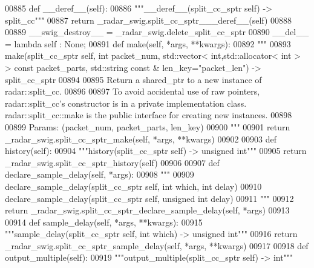 \begin{DoxyCode}
{{{{{00885     \textcolor{keyword}{def }__deref__(self):
00886         \textcolor{stringliteral}{"""\_\_deref\_\_(split\_cc\_sptr self) -> split\_cc"""}
00887         \textcolor{keywordflow}{return} \_radar\_swig.split\_cc\_sptr\_\_\_deref\_\_(self)
00888 
00889     \_\_swig\_destroy\_\_ = \_radar\_swig.delete\_split\_cc\_sptr
00890     \_\_del\_\_ = \textcolor{keyword}{lambda} self : \textcolor{keywordtype}{None};
00891     \textcolor{keyword}{def }make(self, *args, **kwargs):
00892         \textcolor{stringliteral}{"""}
00893 \textcolor{stringliteral}{        make(split\_cc\_sptr self, int packet\_num, std::vector< int,std::allocator< int > > const
       packet\_parts, std::string const & len\_key="packet\_len") -> split\_cc\_sptr}
00894 \textcolor{stringliteral}{}
00895 \textcolor{stringliteral}{        Return a shared\_ptr to a new instance of radar::split\_cc.}
00896 \textcolor{stringliteral}{}
00897 \textcolor{stringliteral}{        To avoid accidental use of raw pointers, radar::split\_cc's constructor is in a private
       implementation class. radar::split\_cc::make is the public interface for creating new instances.}
00898 \textcolor{stringliteral}{}
00899 \textcolor{stringliteral}{        Params: (packet\_num, packet\_parts, len\_key)}
00900 \textcolor{stringliteral}{        """}
00901         \textcolor{keywordflow}{return} \_radar\_swig.split\_cc\_sptr\_make(self, *args, **kwargs)
00902 
00903     \textcolor{keyword}{def }history(self):
00904         \textcolor{stringliteral}{"""history(split\_cc\_sptr self) -> unsigned int"""}
00905         \textcolor{keywordflow}{return} \_radar\_swig.split\_cc\_sptr\_history(self)
00906 
00907     \textcolor{keyword}{def }declare_sample_delay(self, *args):
00908         \textcolor{stringliteral}{"""}
00909 \textcolor{stringliteral}{        declare\_sample\_delay(split\_cc\_sptr self, int which, int delay)}
00910 \textcolor{stringliteral}{        declare\_sample\_delay(split\_cc\_sptr self, unsigned int delay)}
00911 \textcolor{stringliteral}{        """}
00912         \textcolor{keywordflow}{return} \_radar\_swig.split\_cc\_sptr\_declare\_sample\_delay(self, *args)
00913 
00914     \textcolor{keyword}{def }sample_delay(self, *args, **kwargs):
00915         \textcolor{stringliteral}{"""sample\_delay(split\_cc\_sptr self, int which) -> unsigned int"""}
00916         \textcolor{keywordflow}{return} \_radar\_swig.split\_cc\_sptr\_sample\_delay(self, *args, **kwargs)
00917 
00918     \textcolor{keyword}{def }output_multiple(self):
00919         \textcolor{stringliteral}{"""output\_multiple(split\_cc\_sptr self) -> int"""}
}}}}}
\end{DoxyCode}
